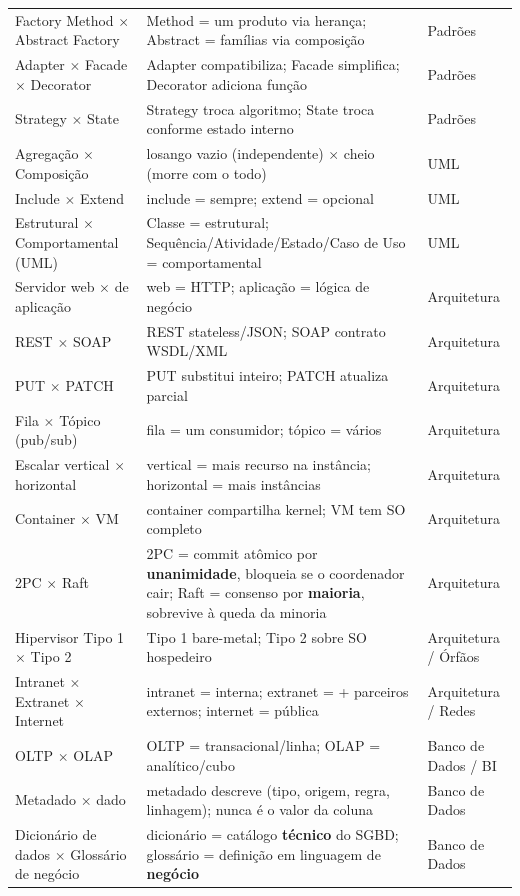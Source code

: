 \begin{longtable}{@{}p{3.3cm}p{6.1cm}p{2.6cm}@{}}
Factory Method $\times$ Abstract Factory & Method = um produto via herança; Abstract = famílias via composição & Padrões \\
Adapter $\times$ Facade $\times$ Decorator & Adapter compatibiliza; Facade simplifica; Decorator adiciona função & Padrões \\
Strategy $\times$ State & Strategy troca algoritmo; State troca conforme estado interno & Padrões \\
Agregação $\times$ Composição & losango vazio (independente) $\times$ cheio (morre com o todo) & UML \\
Include $\times$ Extend & include = sempre; extend = opcional & UML \\
Estrutural $\times$ Comportamental (UML) & Classe = estrutural; Sequência/Atividade/Estado/Caso de Uso = comportamental & UML \\
Servidor web $\times$ de aplicação & web = HTTP; aplicação = lógica de negócio & Arquitetura \\
REST $\times$ SOAP & REST stateless/JSON; SOAP contrato WSDL/XML & Arquitetura \\
PUT $\times$ PATCH & PUT substitui inteiro; PATCH atualiza parcial & Arquitetura \\
Fila $\times$ Tópico (pub/sub) & fila = um consumidor; tópico = vários & Arquitetura \\
Escalar vertical $\times$ horizontal & vertical = mais recurso na instância; horizontal = mais instâncias & Arquitetura \\
Container $\times$ VM & container compartilha kernel; VM tem SO completo & Arquitetura \\
2PC $\times$ Raft & 2PC = commit atômico por \textbf{unanimidade}, bloqueia se o coordenador cair; Raft = consenso por \textbf{maioria}, sobrevive à queda da minoria & Arquitetura \\
Hipervisor Tipo 1 $\times$ Tipo 2 & Tipo 1 bare-metal; Tipo 2 sobre SO hospedeiro & Arquitetura / Órfãos \\
Intranet $\times$ Extranet $\times$ Internet & intranet = interna; extranet = + parceiros externos; internet = pública & Arquitetura / Redes \\
OLTP $\times$ OLAP & OLTP = transacional/linha; OLAP = analítico/cubo & Banco de Dados / BI \\
Metadado $\times$ dado & metadado descreve (tipo, origem, regra, linhagem); nunca é o valor da coluna & Banco de Dados \\
Dicionário de dados $\times$ Glossário de negócio & dicionário = catálogo \textbf{técnico} do SGBD; glossário = definição em linguagem de \textbf{negócio} & Banco de Dados \\

\end{longtable}

